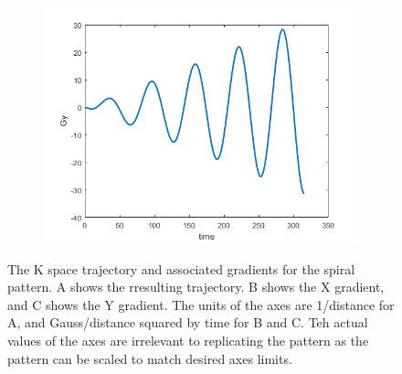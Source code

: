 \documentclass[12pt]{article}
\begin{document}
\begin{figure}[H]
\begin{subfigure}{0.5\textwidth}
	\includegraphics[width=\textwidth]{Figures/SpiralGy.png}
	\caption{}
	\label{Fig:spiralGy}
\end{subfigure}
\caption{The K space trajectory and associated gradients for the spiral pattern. A shows the rresulting trajectory. B shows the X gradient, and C shows the Y gradient. The units of the axes are 1/distance for A, and Gauss/distance squared by time for B and C. Teh actual values of the axes are irrelevant to replicating the pattern as the pattern can be scaled to match desired axes limits.}
\label{fig:spiral}
\end{figure}
\end{document}
